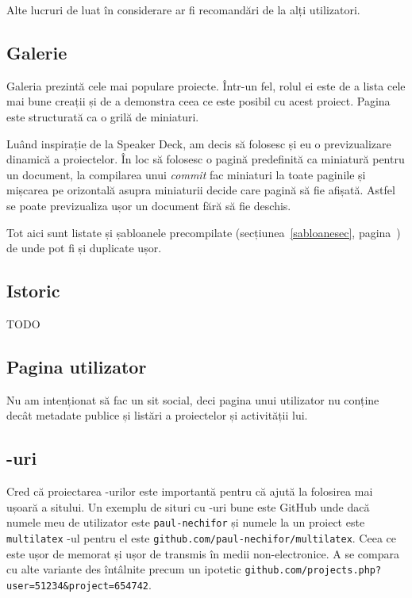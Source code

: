 \documentclass[a4wide,12pt]{report}
\newcommand{\eng}[1]{\emph{#1}} %
\newcommand{\cod}[1]{\texttt{#1}}
\newcommand{\acr}[1]{{\textsmaller[1]{\textsc{#1}}}} %
\newcommand{\idee}[1]{{\color{red} #1}}
\begin{document}
Alte lucruri de luat în considerare ar fi recomandări de la alți utilizatori.

\subsection{Galerie}
\label{galeriesub}

Galeria prezintă cele mai populare proiecte. Într-un fel, rolul ei este de a
lista cele mai bune creații și de a demonstra ceea ce este posibil cu acest
proiect. Pagina este structurată ca o grilă de miniaturi.

Luând inspirație de la Speaker Deck, am decis să folosesc și eu o
previzualizare dinamică a proiectelor. În loc să folosesc o pagină predefinită
ca miniatură pentru un document, la compilarea unui \eng{commit} fac miniaturi
la toate paginile și mișcarea pe orizontală asupra miniaturii decide care pagină
să fie afișată. Astfel se poate previzualiza ușor un document fără să fie
deschis.

Tot aici sunt listate și șabloanele precompilate (secțiunea~\ref{sabloanesec},
pagina~\pageref{sabloanesec}) de unde pot fi și duplicate ușor.

\subsection{Istoric}

\idee{TODO}

\subsection{Pagina utilizator}

Nu am intenționat să fac un sit social, deci pagina unui utilizator nu conține
decât metadate publice și listări a proiectelor și activității lui.

\subsection{\acr{URL}-uri}

Cred că proiectarea \acr{URL}-urilor este importantă pentru că ajută la
folosirea mai ușoară a sitului. Un exemplu de situri cu \acr{URL}-uri bune este
GitHub unde dacă numele meu de utilizator este \cod{paul-nechifor} și numele la
un proiect este \cod{multilatex} \acr{URL}-ul pentru el este
\cod{github.com/paul-nechifor/multilatex}. Ceea ce este ușor de memorat și ușor
de transmis în medii non-electronice. A se compara cu alte variante des
întâlnite precum un ipotetic
\cod{github.com/projects.php?user=51234\&project=654742}.
\end{document}
